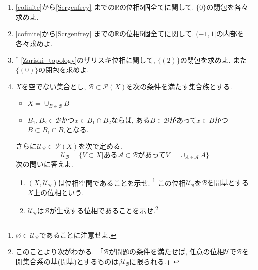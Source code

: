 \documentclass[dvipdfmx,a4paper,11pt]{article}
\newcommand{\R}{\mathbb{R}}
\theoremstyle{definition}
\begin{document}
\begin{enumerate}[label=\textbf{問}\ref*{sec-subspace}.\arabic*]
\item \ref{cofinite}から\ref{Sorgenfrey} までの$\R$の位相5個全てに関して, $\{ 0\}$の閉包を各々求めよ.

\item \ref{cofinite}から\ref{Sorgenfrey} までの$\R$の位相5個全てに関して, $(-1,1]$の内部を各々求めよ.

\item $^{*}$ \ref{Zariski_topology}のザリスキ位相に関して, $\{ (2) \}$の閉包を求めよ. また$\{ (0) \}$の閉包を求めよ.

\newpage 
\item\label{basis_topology}
$X$を空でない集合とし, $\mathscr{B}\subset \mathcal{P}(X)$を次の条件を満たす集合族とする.
\begin{itemize}
 \setlength{\parskip}{0cm} 
  \setlength{\itemsep}{0cm} 
\item $X = \cup_{B \in \mathscr{B} }B$
\item $B_1, B_2\in \mathscr{B} $かつ$x \in B_1\cap B_2$ならば, ある$B \in \mathscr{B}$があって$x\in B$かつ$B \subset B_1\cap B_2$となる.
\end{itemize}
さらに$ \mathscr{U}_{\mathscr{B}} \subset \mathcal{P}(X)$を次で定める.
$$ \mathscr{U}_{\mathscr{B}} = \{ V\subset X | \text{ある$\mathscr{A} \subset \mathscr{B}$があって$V=\cup_{A \in \mathscr{A}}A$}  \}$$
次の問いに答えよ.
\begin{enumerate}
	\setlength{\parskip}{0cm} 
  \setlength{\itemsep}{0cm} 
\item $(X,\mathscr{U}_{\mathscr{B}} )$は位相空間であることを示せ. \footnote{$\varnothing \in \mathscr{U}_{\mathscr{B}}$であることに注意せよ.} この位相$\mathscr{U}_{\mathscr{B}} $を\underline{$\mathscr{B}$を開基とする$X$上の位相}という. 
\item $\mathscr{U}_{\mathscr{B}}$は$\mathscr{B}$が生成する位相であることを示せ.\footnote{このことより次がわかる. 「$\mathscr{B}$が問題の条件を満たせば, 任意の位相$\mathscr{U}$で$\mathscr{B}$を開集合系の基(開基)とするものは,$\mathscr{U}_{\mathscr{B}} $に限られる.」}
\end{enumerate}




\end{enumerate}
\end{document}
